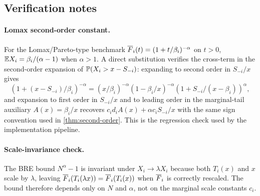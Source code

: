 \subsection{Verification notes}

\paragraph{Lomax second-order constant.}
For the Lomax/Pareto-type benchmark $\overline{F}_i(t)=(1+t/\beta_i)^{-\alpha}$ on
$t>0$, $\mathbb{E} X_i=\beta_i/(\alpha-1)$ when $\alpha>1$. A direct substitution
verifies the cross-term in the second-order expansion of
$\mathbb{P}(X_i>x-S_{-i})$: expanding to second order in $S_{-i}/x$ gives
\[
  (1+(x-S_{-i})/\beta_i)^{-\alpha}
  = (x/\beta_i)^{-\alpha}\left(1-\beta_i/x\right)^{-\alpha}
    \left(1+S_{-i}/(x-\beta_i)\right)^{\alpha},
\]
and expansion to first order in $S_{-i}/x$ and to leading order in the
marginal-tail auxiliary $A(x)=\beta_i/x$ recovers
$c_i d_i A(x)+\alpha c_i S_{-i}/x$ with the same sign convention used in
\cref{thm:second-order}. This is the regression check used by the
implementation pipeline.

\paragraph{Scale-invariance check.}
The BRE bound $N^\alpha-1$ is invariant under $X_i\to\lambda X_i$ because both
$T_i(x)$ and $x$ scale by $\lambda$, leaving $\overline{F}_i(T_i(\lambda x))=\overline{F}_i(T_i(x))$
when $\overline{F}_i$ is correctly rescaled. The bound therefore depends only on $N$ and
$\alpha$, not on the marginal scale constants $c_i$.
